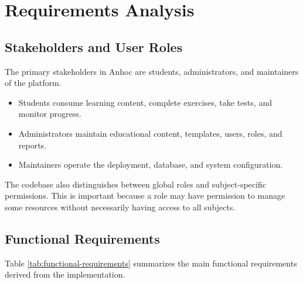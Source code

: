 \section{Requirements Analysis}

\subsection{Stakeholders and User Roles}

The primary stakeholders in Anhoc are students, administrators, and maintainers of the platform.

\begin{itemize}
  \item Students consume learning content, complete exercises, take tests, and monitor progress.
  \item Administrators maintain educational content, templates, users, roles, and reports.
  \item Maintainers operate the deployment, database, and system configuration.
\end{itemize}

The codebase also distinguishes between global roles and subject-specific permissions. This is important because a role may have permission to manage some resources without necessarily having access to all subjects.

\subsection{Functional Requirements}

Table \ref{tab:functional-requirements} summarizes the main functional requirements derived from the implementation.

